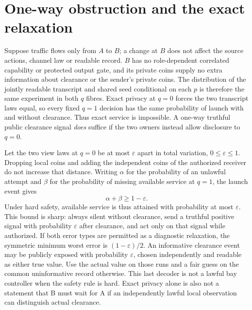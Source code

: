 \documentclass[11pt]{article}
\begin{document}
\section{One-way obstruction and the exact relaxation}
Suppose traffic flows only from \(A\) to \(B\); a change at \(B\)
does not affect the source actions, channel law or readable record.
\(B\) has no role-dependent correlated capability or protected
output gate, and its private coins supply no extra information
about clearance or the sender's private coins. The distribution of
the jointly readable transcript and shared seed conditional on each
\(p\) is therefore the same experiment in both \(q\) fibres. Exact
privacy at \(q=0\) forces the two transcript laws equal, so every
fixed \(q=1\) decision has the same probability of launch with and
without clearance. Thus exact service is impossible. A one-way
truthful public clearance signal \emph{does} suffice if the two
owners instead allow disclosure to \(q=0\).

Let the two view laws at \(q=0\) be at most \(\varepsilon\) apart
in total variation, \(0\le\varepsilon\le1\). Dropping local coins
and adding the independent coins of the authorized receiver do not
increase that distance. Writing \(\alpha\) for the probability of
an unlawful attempt and \(\beta\) for the probability of missing
available service at \(q=1\), the launch event gives
\[
           \alpha+\beta\ge 1-\varepsilon.
\]
Under hard safety, available service is thus attained with
probability at most \(\varepsilon\). This bound is sharp:
always silent without clearance, send a truthful positive signal
with probability \(\varepsilon\) after clearance, and act only on
that signal while authorized. If both error types are permitted
as a diagnostic relaxation, the symmetric minimum worst error
is \((1-\varepsilon)/2\). An informative clearance event may
be publicly exposed with probability \(\varepsilon\), chosen
independently and readable as either true value. Use the actual
value on those runs and a fair guess on the common uninformative
record otherwise. This last decoder is not a lawful bay controller
when the safety rule is hard. Exact privacy alone is also not a
statement that B must wait for A if an independently lawful
local observation can distinguish actual clearance.
\end{document}
